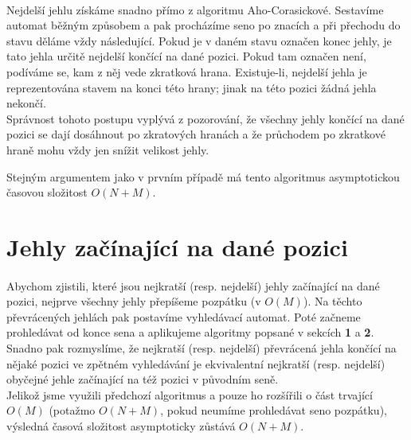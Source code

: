 \documentclass{scrartcl}
\begin{document}
\paragraph{}
Nejdelší jehlu získáme snadno přímo z algoritmu Aho-Corasickové. Sestavíme automat běžným způsobem a pak procházíme seno po znacích a při přechodu do stavu děláme vždy následující. Pokud je v daném stavu označen konec jehly, je tato jehla určitě nejdelší končící na dané pozici. Pokud tam označen není, podíváme se, kam z něj vede zkratková hrana. Existuje-li, nejdelší jehla je reprezentována stavem na konci této hrany; jinak na této pozici žádná jehla nekončí. \\

Správnost tohoto postupu vyplývá z pozorování, že všechny jehly končící na dané pozici se dají dosáhnout po zkratových hranách a že průchodem po zkratkové hraně mohu vždy jen snížit velikost jehly. \\
\pagebreak

Stejným argumentem jako v prvním případě má tento algoritmus asymptotickou časovou složitost $O(N + M)$.

\section{Jehly začínající na dané pozici}
\paragraph{}
Abychom zjistili, které jsou nejkratší (resp. nejdelší) jehly začínající na dané pozici, nejprve všechny jehly přepíšeme pozpátku (v $O(M)$). Na těchto převrácených jehlách pak postavíme vyhledávací automat. Poté začneme prohledávat od konce sena a aplikujeme algoritmy popsané v sekcích \textbf{1} a \textbf{2}. \\

Snadno pak rozmyslíme, že nejkratší (resp. nejdelší) převrácená jehla končící na nějaké pozici ve zpětném vyhledávání je ekvivalentní nejkratší (resp. nejdelší) obyčejné jehle začínající na též pozici v původním seně. \\

Jelikož jsme využili předchozí algoritmus a pouze ho rozšířili o část trvající $O(M)$ (potažmo $O(N+M)$, pokud neumíme prohledávat seno pozpátku), výsledná časová složitost asymptoticky zůstává $O(N+M)$.
\end{document}
